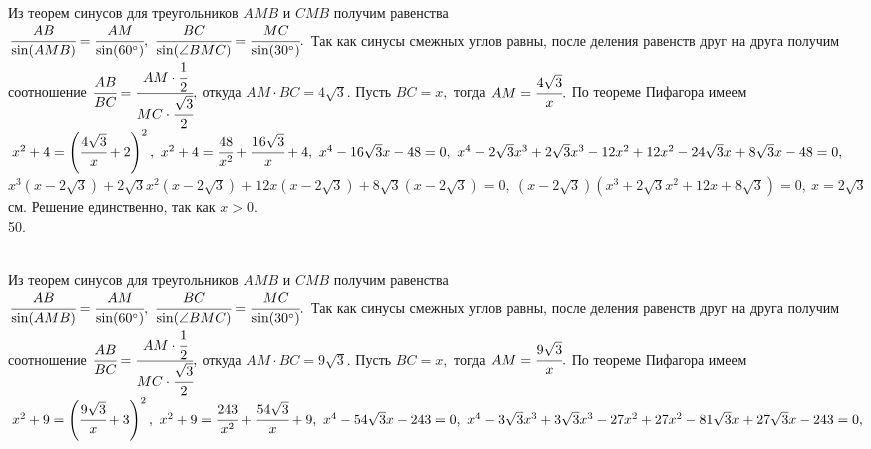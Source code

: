 \documentclass[12pt]{article}
\begin{document}
Из теорем синусов для треугольников $AMB$ и $CMB$ получим равенства\\ $\cfrac{AB}{\sin(AMB)}=\cfrac{AM}{\sin(60^\circ)},\ \cfrac{BC}{\sin(\angle BMC)}= \cfrac{MC}{\sin(30^\circ)}.$ Так как синусы смежных углов равны, после деления равенств друг на друга получим соотношение $\cfrac{AB}{BC}=\cfrac{AM\cdot\cfrac{1}{2}}{MC\cdot\cfrac{\sqrt{3}}{2}},$ откуда $AM\cdot BC=4\sqrt{3}.$ Пусть $BC=x,$ тогда $AM=\cfrac{4\sqrt{3}}{x}.$ По теореме Пифагора имеем $x^2+4=\left(\cfrac{4\sqrt{3}}{x}+2\right)^2,\ x^2+4=\cfrac{48}{x^2}+\cfrac{16\sqrt{3}}{x}+4,\ x^4-16\sqrt{3}x-48=0,\ x^4-2\sqrt{3}x^3+2\sqrt{3}x^3-12x^2+12x^2-24\sqrt{3}x+8\sqrt{3}x-48=0,$\\
$x^3(x-2\sqrt{3})+2\sqrt{3}x^2(x-2\sqrt{3})+12x(x-2\sqrt{3})+8\sqrt{3}(x-2\sqrt{3})=0,\ (x-2\sqrt{3})(x^3+2\sqrt{3}x^2+12x+8\sqrt{3})=0,\ x=2\sqrt{3}$см. Решение единственно, так как $x>0.$\\
50. \begin{figure}[ht!]
\end{figure}\\
Из теорем синусов для треугольников $AMB$ и $CMB$ получим равенства\\ $\cfrac{AB}{\sin(AMB)}=\cfrac{AM}{\sin(60^\circ)},\ \cfrac{BC}{\sin(\angle BMC)}= \cfrac{MC}{\sin(30^\circ)}.$ Так как синусы смежных углов равны, после деления равенств друг на друга получим соотношение $\cfrac{AB}{BC}=\cfrac{AM\cdot\cfrac{1}{2}}{MC\cdot\cfrac{\sqrt{3}}{2}},$ откуда $AM\cdot BC=9\sqrt{3}.$ Пусть $BC=x,$ тогда $AM=\cfrac{9\sqrt{3}}{x}.$ По теореме Пифагора имеем $x^2+9=\left(\cfrac{9\sqrt{3}}{x}+3\right)^2,\ x^2+9=\cfrac{243}{x^2}+\cfrac{54\sqrt{3}}{x}+9,\ x^4-54\sqrt{3}x-243=0,\ x^4-3\sqrt{3}x^3+3\sqrt{3}x^3-27x^2+27x^2-81\sqrt{3}x+27\sqrt{3}x-243=0,$\\
\end{document}
